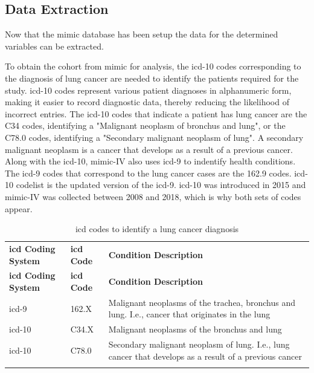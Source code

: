 \documentclass[11pt]{article}
\begin{document}
\subsection{Data Extraction}
Now that the \gls{mimic} database has been setup the data for the determined variables can be extracted.

To obtain the cohort from \gls{mimic} for analysis, the \gls{icd}-10 \cite{ICD10}codes corresponding to the diagnosis of lung cancer are needed to identify the patients required for the study. \gls{icd}-10 codes represent various patient diagnoses in alphanumeric form, making it easier to record diagnostic data, thereby reducing the likelihood of incorrect entries. The \gls{icd}-10 codes that indicate a patient has lung cancer are the C34 codes, identifying a "Malignant neoplasm of bronchus and lung", or the C78.0 codes, identifying a "Secondary malignant neoplasm of lung". A secondary malignant neoplasm is a cancer that develops as a result of a previous cancer. Along with the \gls{icd}-10, \gls{mimic}-IV also uses \gls{icd}-9 to indentify health conditions. The \gls{icd}-9 codes that correspond to the lung cancer cases are the 162.9 codes. \gls{icd}-10 codelist is the updated version of the \gls{icd}-9. \gls{icd}-10 was introduced in 2015 and \gls{mimic}-IV was collected between 2008 and 2018, which is why both sets of codes appear.

{\seriffont
{\small
\renewcommand{\arraystretch}{1}
\centering
\begin{center}
\setlength{\arrayrulewidth}{0.7mm}
\begin{longtable}{ | L{2cm} | L{3cm} | L{8cm} | } 
    \hline
    \textbf{\gls{icd} Coding System} & \textbf{\gls{icd} Code} & \textbf{Condition Description}  \\ 
    \noalign{\global\setlength{\arrayrulewidth}{0.7mm}}
    \hline
    \endfirsthead

\hline
\textbf{\gls{icd} Coding System} & \textbf{\gls{icd} Code} & \textbf{Condition Description} \\
\hline
\endhead
\gls{icd}-9 & 162.X & Malignant neoplasms of the trachea, bronchus and lung. I.e., cancer that originates in the lung  \\ 
    \noalign{\global\setlength{\arrayrulewidth}{0.05mm}}
    \hline
    \noalign{\global\setlength{\arrayrulewidth}{0.7mm}}
\gls{icd}-10 & C34.X & Malignant neoplasms of the bronchus and lung  \\ 
    \noalign{\global\setlength{\arrayrulewidth}{0.05mm}}
    \hline
    \noalign{\global\setlength{\arrayrulewidth}{0.7mm}}
\gls{icd}-10 & C78.0 & Secondary malignant neoplasm of lung. I.e., lung cancer that develops as a result of a previous cancer  \\ 
    \hline
\caption[\gls{icd} codes]{\gls{icd} codes to identify a lung cancer diagnosis}
\label{tab:my_label}\\
\end{longtable}
\end{center}}}
\normalsize
\end{document}
